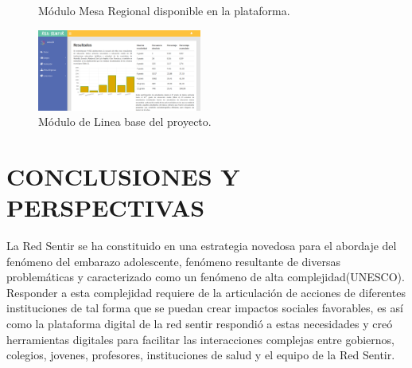 \documentclass[journal,transmag]{IEEEtran}
\begin{document}
\begin{figure}[tbp]
  \centering
	  \hspace{1mm}
  \caption{Módulo Mesa Regional disponible en la plataforma. }
  \label{fig:mesa}
\end{figure}

\begin{figure}[tbp]
\centering
\includegraphics[width=0.48\textwidth]{resultados.png}
\caption{Módulo de Linea base del proyecto.}
\label{fig:lineabase}
\end{figure}

\section{CONCLUSIONES Y PERSPECTIVAS}\label{sec:conclusiones}
La Red Sentir se ha constituido en una estrategia novedosa para el abordaje del fenómeno del embarazo adolescente, fenómeno resultante de diversas problemáticas y caracterizado como un fenómeno de alta complejidad(UNESCO). Responder a esta complejidad requiere de la articulación de acciones de diferentes instituciones de tal forma que se puedan crear impactos sociales favorables, es así como la plataforma digital de la red sentir respondió a estas necesidades y creó herramientas digitales para facilitar las interacciones complejas entre gobiernos, colegios, jovenes, profesores, instituciones de salud y el equipo de la Red Sentir.
\end{document}
